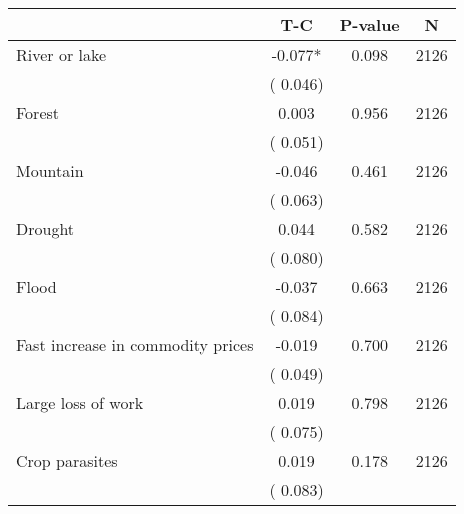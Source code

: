 
\begin{tabular}{l*{3}{c}}\hline&\multicolumn{1}{c}{T-C}&\multicolumn{1}{c}{P-value}&\multicolumn{1}{c}{N} \\ \hline
 River or lake                 &             -0.077*          &        0.098 & 2126          \\ 
                               &        (       0.046)             &                        &                              \\ 
 Forest                 &              0.003          &        0.956 & 2126          \\ 
                               &        (       0.051)             &                        &                              \\ 
 Mountain                 &             -0.046          &        0.461 & 2126          \\ 
                               &        (       0.063)             &                        &                              \\ 
 Drought                 &              0.044          &        0.582 & 2126          \\ 
                               &        (       0.080)             &                        &                              \\ 
 Flood                 &             -0.037          &        0.663 & 2126          \\ 
                               &        (       0.084)             &                        &                              \\ 
 Fast increase in commodity prices                 &             -0.019          &        0.700 & 2126          \\ 
                               &        (       0.049)             &                        &                              \\ 
 Large loss of work                 &              0.019          &        0.798 & 2126          \\ 
                               &        (       0.075)             &                        &                              \\ 
 Crop parasites                 &              0.019          &        0.178 & 2126          \\ 
                               &        (       0.083)             &                        &                              \\ 

\end{tabular}
